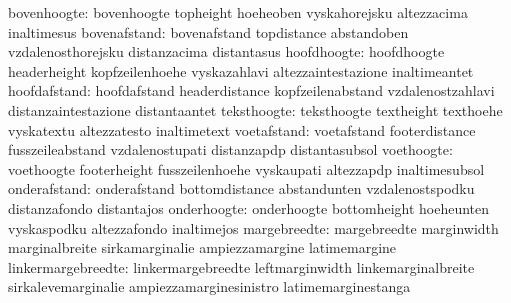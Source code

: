                      bovenhoogte: bovenhoogte                      topheight
                                  hoeheoben                        vyskahorejsku
                                  altezzacima                      inaltimesus
                    bovenafstand: bovenafstand                     topdistance
                                  abstandoben                      vzdalenosthorejsku
                                  distanzacima                     distantasus
                     hoofdhoogte: hoofdhoogte                      headerheight
                                  kopfzeilenhoehe                  vyskazahlavi
                                  altezzaintestazione              inaltimeantet
                    hoofdafstand: hoofdafstand                     headerdistance
                                  kopfzeilenabstand                vzdalenostzahlavi
                                  distanzaintestazione             distantaantet
                     teksthoogte: teksthoogte                      textheight
                                  texthoehe                        vyskatextu
                                  altezzatesto                     inaltimetext
                     voetafstand: voetafstand                      footerdistance
                                  fusszeileabstand                 vzdalenostupati
                                  distanzapdp                      distantasubsol
                      voethoogte: voethoogte                       footerheight
                                  fusszeilenhoehe                  vyskaupati
                                  altezzapdp                       inaltimesubsol
                    onderafstand: onderafstand                     bottomdistance
                                  abstandunten                     vzdalenostspodku
                                  distanzafondo                    distantajos
                     onderhoogte: onderhoogte                      bottomheight
                                  hoeheunten                       vyskaspodku
                                  altezzafondo                     inaltimejos
                    margebreedte: margebreedte                     marginwidth
                                  marginalbreite                   sirkamarginalie
                                  ampiezzamargine                  latimemargine %
              linkermargebreedte: linkermargebreedte               leftmarginwidth
                                  linkemarginalbreite              sirkalevemarginalie
                                  ampiezzamarginesinistro          latimemarginestanga
